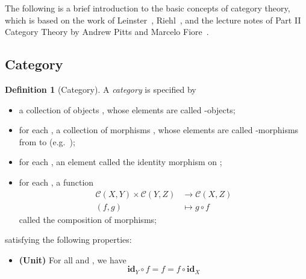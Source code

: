 \documentclass[12pt,a4paper]{report}
\theoremstyle{definition}
\newtheorem{definition}{Definition}[chapter]
\begin{document}
        The following is a brief introduction to the basic concepts of category theory, which is based on the work of Leinster~\autocite{basic_cat}, 
        Riehl~\autocite{cat_context}, and the lecture notes of Part II Category Theory by Andrew Pitts and Marcelo Fiore~\autocite{cat_lecture_notes}.

        \subsection{Category}
        \begin{definition}[Category] \label{def: category}
            A \emph{category}  is specified by
            \begin{itemize}
                \item 
                    a collection of objects , whose elements are called -objects;
                \item 
                    for each , a collection of morphisms , whose elements are called -morphisms from  to  (e.g.\ );
                \item 
                    for each , an element  called the identity morphism on ;
                \item 
                    for each , a function 
                    \[\begin{aligned}
                        \mathcal{C}{(X,Y)} \times \mathcal{C}{(Y,Z)} &\to \mathcal{C}{(X,Z)} \\
                        (f,g) &\mapsto g \circ f
                    \end{aligned}\]
                    called the composition of morphisms;
            \end{itemize}
            satisfying the following properties:
            \begin{itemize}
                \item 
                    \textbf{(Unit)}
                    For all  and , we have
                    \begin{equation} \label{law: unit}
                        \textbf{id}_Y \circ f = f = f \circ \textbf{id}_X

\end{equation}
\end{itemize}
\end{definition}
\end{document}
